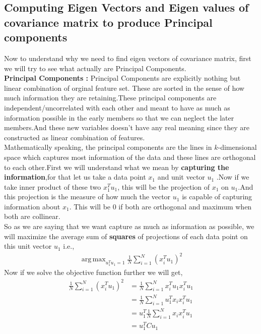 \documentclass[journal,12pt,onecolumn]{IEEEtran}
\DeclareMathOperator*{\argmax}{arg\,max}
\providecommand{\brak}[1]{\ensuremath{\left(#1\right)}}
\theoremstyle{remark}
\numberwithin{equation}{section}
\begin{document}
		\subsection{Computing Eigen Vectors and Eigen values of covariance matrix to produce Principal components}
		  Now to understand why we need to find eigen vectors of covariance matrix, first we will try to see what actually are Principal Components.\\
		  \textbf{Principal Components :} Principal Components are explicitly nothing but linear combination of orginal feature set. These are sorted in the sense of how much information they are retaining.These principal components are independent/uncorrelated with each other and meant to have as much as information possible in the early members so that we can neglect the later members.And these new variables doesn't have any real meaning since they are constructed as linear combination of features.\\ 
  Mathematically speaking, the principal components are the lines in $k$-dimensional space which captures most information of the data and these lines are orthogonal to each other.First we will understand what we mean by \textbf{capturing the information},for that let us take a data point $x_1$ and unit vector $u_1$ .Now if we take inner product of these two $x_1^{T}u_1$, this will be the projection of $x_1$ on $u_1$.And this projection is the measure of how much the vector $u_1$ is capable of capturing information about $x_1$. This will be $0$ if both are orthogonal and maximum when both are collinear.\\
  So as we are saying that we want capture as much as information as possible, we will maximize the average sum of \textbf{squares} of projections of each data point on this unit vector $u_1$ i.e.,
	  \begin{align}
		  \argmax_{u_1^Tu_1 =1} \frac{1}{N}\sum_{i=1}^{N}\brak{x_i^Tu_1}^2
          \end{align}
	  Now if we solve the objective function further we will get,
	   \begin{align}
		  \frac{1}{N}\sum_{i=1}^{N}\brak{x_i^Tu_1}^2 &= \frac{1}{N}\sum_{i=1}^{N}x_i^Tu_1x_i^Tu_1\\
		                                             &= \frac{1}{N}\sum_{i=1}^{N}u_1^Tx_ix_i^Tu_1\\
						             &= u_1^T\frac{1}{N}\sum_{i=1}^{N}x_ix_i^Tu_1\\
						             &= u_1^TCu_1 
	   \end{align}
\end{document}
